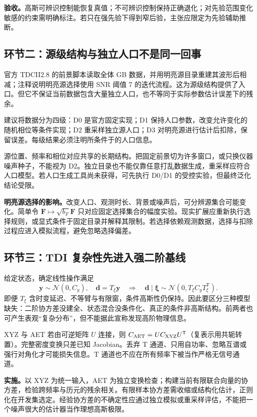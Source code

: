 \documentclass[UTF8,fontset=fandol,a4paper,11pt]{ctexart}
\numberwithin{equation}{section}
\newcommand{\Normal}{\mathcal N}
\newcommand{\bxi}{\boldsymbol\xi}
\newcommand{\bF}{\boldsymbol F}
\begin{document}
\textbf{验收。}高斯可辨识控制能恢复真值；不可辨识控制保持正确退化；对先验范围变化敏感的约束需明确标注。若只在强先验下得到窄后验，主张应限定为先验辅助推断。

\subsection{环节二：源级结构与独立人口不是同一回事}
官方 TDCII2.8 的前景脚本读取全体 GB 数据，并用明亮源目录重建其波形后相减；注释说明明亮源选择使用 SNR 阈值 7 的迭代流程\cite{foreground}。这为源级结构提供了入口。但它不保证当前数据包含大量独立人口，也不等同于实际参数估计误差下的残余。

建议将数据分为四级：D0 是官方固定实现；D1 保持人口参数，改变允许变化的随机相位等条件实现；D2 重采样独立源人口；D3 对明亮源进行估计后扣除，保留误差。每级结果必须注明所条件于的人口信息。

源位置、频率和相位对应共享的长期结构。把固定前景切为许多窗口，或只换仪器噪声种子，不能视为 D2。独立目录也不能仅靠任意打乱数据生成，重采样应符合人口模型。若人口生成工具尚未获得，可先执行 D0/D1 的受控实验，但最终泛化结论受限。

\textbf{明亮源选择的影响。}改变人口、观测时长、背景或噪声后，可分辨源集合可能变化。简单令 $\bF\mapsto\sqrt{b_F}\bF$ 只对应固定选择集合的幅度实验。现实扩展应重新执行选择规则，或显式条件于固定目录并解释其限制。若选择依赖观测数据，选择与扣除过程应进入模拟流程，避免忽略选择偏差。

\subsection{环节三：TDI 复杂性先进入强二阶基线}
给定状态，确定线性操作满足
\begin{equation}
\boldsymbol y\sim\Normal(0,C_y),\quad
\boldsymbol d=T_\xi\boldsymbol y
\quad\Rightarrow\quad
\boldsymbol d\mid\bxi\sim\Normal(0,T_\xi C_yT_\xi^{\mathsf T}).
\end{equation}
即便 $T_\xi$ 含时变延迟、不等臂与有限窗，条件高斯性仍保持。因此要区分三种模型缺失：二阶协方差没建全、状态混合没条件化、真正的条件非高斯结构。前两者也可产生表观“复杂分布”，但不能据此宣称发现高阶物理信息。

XYZ 与 AET 若由可逆矩阵 $U$ 连接，则 $C_{\rm AET}=UC_{\rm XYZ}U^{\mathsf T}$（复表示用共轭转置）。完整密度变换只差已知 Jacobian。丢弃 T 通道、只用自功率、忽略互谱或强行对角化才可能损失信息。T 通道也不应在所有频率下被当作严格无信号通道。

\textbf{实施。}以 XYZ 为统一输入，AET 为独立变换检查；构建当前有限联合向量的协方差，检验跨频率与历元的残余相关。有限样本协方差需收缩或结构化估计，正则化在开发集选定。经验协方差的不确定性应通过独立模拟或重采样评估，不能把一个噪声很大的估计器当作理想高斯极限。
\end{document}
